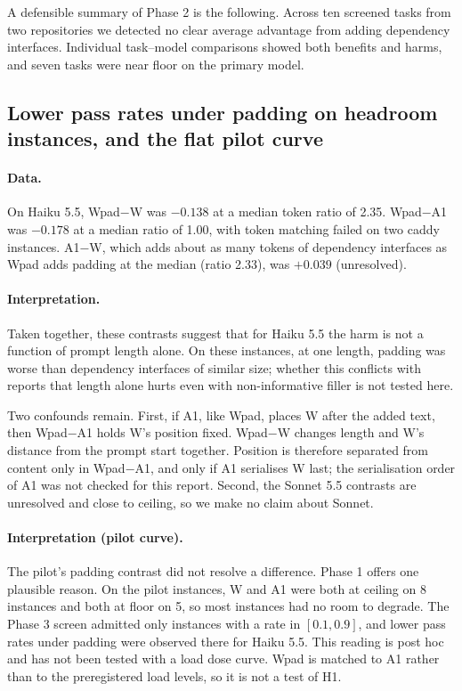 A defensible summary of Phase 2 is the following. Across ten screened tasks from two repositories we detected no clear average advantage from adding dependency interfaces. Individual task--model comparisons showed both benefits and harms, and seven tasks were near floor on the primary model.

\subsection{Lower pass rates under padding on headroom instances, and the flat pilot curve}

\paragraph{Data.} On Haiku 5.5, Wpad$-$W was $-0.138$ at a median token ratio of 2.35. Wpad$-$A1 was $-0.178$ at a median ratio of 1.00, with token matching failed on two caddy instances. A1$-$W, which adds about as many tokens of dependency interfaces as Wpad adds padding at the median (ratio 2.33), was $+0.039$ (unresolved).

\paragraph{Interpretation.} Taken together, these contrasts suggest that for Haiku 5.5 the harm is not a function of prompt length alone. On these instances, at one length, padding was worse than dependency interfaces of similar size; whether this conflicts with reports that length alone hurts even with non-informative filler \cite{du2025} is not tested here.

Two confounds remain. First, if A1, like Wpad, places W after the added text, then Wpad$-$A1 holds W's position fixed. Wpad$-$W changes length and W's distance from the prompt start together. Position \cite{liu2024} is therefore separated from content only in Wpad$-$A1, and only if A1 serialises W last; the serialisation order of A1 was not checked for this report. Second, the Sonnet 5.5 contrasts are unresolved and close to ceiling, so we make no claim about Sonnet.

\paragraph{Interpretation (pilot curve).} The pilot's padding contrast did not resolve a difference. Phase 1 offers one plausible reason. On the pilot instances, W and A1 were both at ceiling on 8 instances and both at floor on 5, so most instances had no room to degrade. The Phase 3 screen admitted only instances with a rate in $[0.1, 0.9]$, and lower pass rates under padding were observed there for Haiku 5.5. This reading is post hoc and has not been tested with a load dose curve. Wpad is matched to A1 rather than to the preregistered load levels, so it is not a test of H1.

